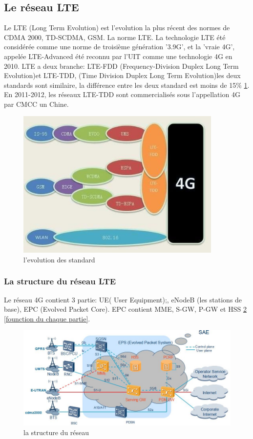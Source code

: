 \subsection{Le réseau LTE}
Le LTE (Long Term Evolution) est l'evolution la plus récent des normes de CDMA 2000, TD-SCDMA, GSM. La norme LTE. La technologie LTE été considérée comme une norme de troisième génération '3.9G', et la 'vraie 4G', appelée LTE-Advanced été reconnu par l'UIT comme une technologie 4G en 2010. LTE a deux branche: LTE-FDD (Frequency-Division Duplex  Long Term Evolution)et LTE-TDD, (Time Division Duplex Long Term Evolution)les deux standards sont similaire, la différence entre les deux standard est moins de 15\% \ref{evolution}. En 2011-2012, les réseaux LTE-TDD sont commercialisés sous l'appellation 4G par CMCC un Chine.
      \begin{figure}[H]
          \centering
          \includegraphics[width=4in]{images/evolution.JPG}
          \caption{l'evolution des standard}
          \label{evolution}
      \end{figure}
      
\subsubsection{La structure du réseau LTE}
Le réseau 4G contient 3 partie: UE( User Equipment);, eNodeB (les stations de base), EPC (Evolved Packet Core). EPC contient MME, S-GW, P-GW et HSS \ref{structure4G}  \ref{founction du chaque partie}. 
    
      \begin{figure}[H]
          \centering
          \includegraphics[width=5in]{images/enb2.jpg}
          \caption{la structure du réseau}
          \label{structure4G}
      \end{figure}
      
